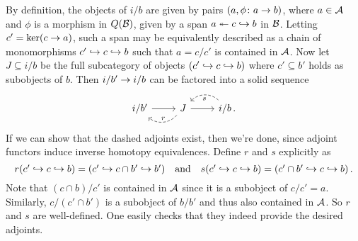 \documentclass[a4paper, 10pt, oneside, DIV=9, chapterprefix=true, numbers=enddot,bibliography=totoc]{scrbook}
\begin{document}
\begin{proof*}
	By definition, the objects of $i/b$ are given by pairs $(a,\phi\colon a\morphism b)$, where $a\in \mathcal{A}$ and $\phi$ is a morphism in $Q(\mathcal{B})$, given by a span $a\lepimorphism c\monomorphism b$ in $\mathcal{B}$. Letting $c'=\ker(c\morphism a)$, such a span may be equivalently described as a chain of monomorphisms $c'\monomorphism c\monomorphism b$ such that $a=c/c'$ is contained in $\mathcal{A}$. Now let $J\subseteq i/b$ be the full subcategory of objects $(c'\monomorphism c\monomorphism b)$ where $c'\subseteq b'$ holds as subobjects of $b$. Then $i/b'\morphism i/b$ can be factored into a solid sequence
	\begin{equation*}
		\begin{tikzcd}
			i/b'\rar& J\rar \lar[dashed,bend left=45,"r"{above,swap}] & i/b\,.\lar[dashed,bend right=45,"s"]
		\end{tikzcd}
	\end{equation*}
	If we can show that the dashed adjoints exist, then we're done, since adjoint functors induce inverse homotopy equivalences. Define $r$ and $s$ explicitly as
	\begin{equation*}
		\textstyle r(c'\monomorphism c\monomorphism b)=(c'\monomorphism c\cap b'\monomorphism b')\quad\text{and}\quad s(c'\monomorphism c\monomorphism b)=(c'\cap b'\monomorphism c\monomorphism b)\,.
	\end{equation*}
	Note that $(c\cap b)/c'$ is contained in $\mathcal{A}$ since it is a subobject of $c/c'=a$. Similarly, $c/(c'\cap b')$ is a subobject of $b/b'$ and thus also contained in $\mathcal{A}$. So $r$ and $s$ are well-defined. One easily checks that they indeed provide the desired adjoints.
\end{proof*}
%
\end{document}
